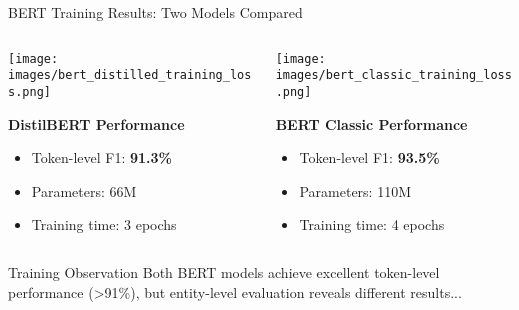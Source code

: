 \documentclass[aspectratio=169]{beamer}
\begin{document}
\begin{frame}{BERT Training Results: Two Models Compared}
\begin{columns}
\begin{column}{0.5\textwidth}
\begin{center}
\texttt{[image: images/bert\_distilled\_training\_loss.png]}
\caption{DistilBERT Training}
\end{center}

\textbf{DistilBERT Performance}
\begin{itemize}
\item Token-level F1: \textbf{91.3\%}
\item Parameters: 66M
\item Training time: 3 epochs
\end{itemize}
\end{column}
\begin{column}{0.5\textwidth}
\begin{center}
\texttt{[image: images/bert\_classic\_training\_loss.png]}
\caption{BERT Classic Training}
\end{center}

\textbf{BERT Classic Performance}
\begin{itemize}
\item Token-level F1: \textbf{93.5\%}
\item Parameters: 110M
\item Training time: 4 epochs
\end{itemize}
\end{column}
\end{columns}

\vspace{0.3cm}
\begin{alertblock}{Training Observation}
Both BERT models achieve excellent token-level performance (>91\%), but entity-level evaluation reveals different results...
\end{alertblock}
\end{frame}
\end{document}

